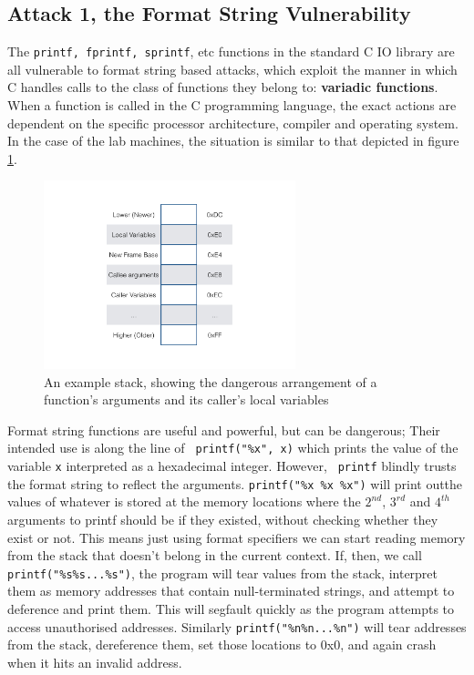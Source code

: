\subsection{Attack 1, the Format String Vulnerability}

The {\tt printf, fprintf, sprintf}, etc functions in the standard C IO library are all vulnerable to format string based
attacks, which exploit the manner in which C handles calls to the class of functions they belong to: \textbf{variadic
functions}\cite{vfunc}. When a function is called in the C programming language,\cite{call_conv} the exact actions are
dependent on the specific processor architecture, compiler and operating system. In the case of the lab machines, the
situation is similar to that depicted in figure \ref{fig_stack}.

\begin{figure}[ht] \centering \includegraphics[width = 0.65\textwidth]{./images/stack.jpg} \caption{An example stack,
showing the dangerous arrangement of a function's arguments and its caller's local variables} \label{fig_stack}
\end{figure}

Format string functions are useful and powerful, but can be dangerous; Their intended use is along the line of {\tt
printf("\%x", x)} which prints the value of the variable {\tt x} interpreted as a hexadecimal integer. However, {\tt
printf} blindly trusts the format string to reflect the arguments. {\tt printf("\%x \%x \%x")} will print outthe values
of whatever is stored at the memory locations where the $2^{nd}$, $3^{rd}$ and $4^{th}$ arguments to printf should be if
they existed, without checking whether they exist or not. This means just using format specifiers we can start reading
memory from the stack that doesn't belong in the current context. If, then, we call {\tt printf("\%s\%s...\%s")}, the
program will tear values from the stack, interpret them as memory addresses that contain null-terminated strings, and
attempt to deference and print them. This will segfault quickly as the program attempts to access unauthorised
addresses. Similarly {\tt printf("\%n\%n...\%n")} will tear addresses from the stack, dereference them, set those
locations to 0x0, and again crash when it hits an invalid address.

